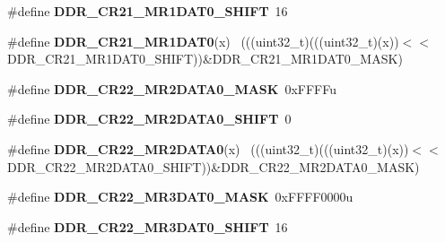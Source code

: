 \begin{DoxyCompactItemize}
\item 
\hypertarget{group___d_d_r___register___masks_gadfa946a8ccca9eb80a28a8cdddaa2c47}{}\#define {\bfseries D\+D\+R\+\_\+\+C\+R21\+\_\+\+M\+R1\+D\+A\+T0\+\_\+\+S\+H\+I\+F\+T}~16\label{group___d_d_r___register___masks_gadfa946a8ccca9eb80a28a8cdddaa2c47}

\item 
\hypertarget{group___d_d_r___register___masks_ga739910b443ad045dfb582322bc08f86f}{}\#define {\bfseries D\+D\+R\+\_\+\+C\+R21\+\_\+\+M\+R1\+D\+A\+T0}(x)                                        ~(((uint32\+\_\+t)(((uint32\+\_\+t)(x))$<$$<$D\+D\+R\+\_\+\+C\+R21\+\_\+\+M\+R1\+D\+A\+T0\+\_\+\+S\+H\+I\+F\+T))\&D\+D\+R\+\_\+\+C\+R21\+\_\+\+M\+R1\+D\+A\+T0\+\_\+\+M\+A\+S\+K)\label{group___d_d_r___register___masks_ga739910b443ad045dfb582322bc08f86f}

\item 
\hypertarget{group___d_d_r___register___masks_gab836b10a64429635c7a64460f8bf5132}{}\#define {\bfseries D\+D\+R\+\_\+\+C\+R22\+\_\+\+M\+R2\+D\+A\+T\+A0\+\_\+\+M\+A\+S\+K}~0x\+F\+F\+F\+Fu\label{group___d_d_r___register___masks_gab836b10a64429635c7a64460f8bf5132}

\item 
\hypertarget{group___d_d_r___register___masks_gab3b7ec00255d0b7a3b4b91347ffc4a70}{}\#define {\bfseries D\+D\+R\+\_\+\+C\+R22\+\_\+\+M\+R2\+D\+A\+T\+A0\+\_\+\+S\+H\+I\+F\+T}~0\label{group___d_d_r___register___masks_gab3b7ec00255d0b7a3b4b91347ffc4a70}

\item 
\hypertarget{group___d_d_r___register___masks_ga0b528e95966c4951222da035247c2f7d}{}\#define {\bfseries D\+D\+R\+\_\+\+C\+R22\+\_\+\+M\+R2\+D\+A\+T\+A0}(x)                                      ~(((uint32\+\_\+t)(((uint32\+\_\+t)(x))$<$$<$D\+D\+R\+\_\+\+C\+R22\+\_\+\+M\+R2\+D\+A\+T\+A0\+\_\+\+S\+H\+I\+F\+T))\&D\+D\+R\+\_\+\+C\+R22\+\_\+\+M\+R2\+D\+A\+T\+A0\+\_\+\+M\+A\+S\+K)\label{group___d_d_r___register___masks_ga0b528e95966c4951222da035247c2f7d}

\item 
\hypertarget{group___d_d_r___register___masks_ga7cdbc794400570a81530eaaec3f67c46}{}\#define {\bfseries D\+D\+R\+\_\+\+C\+R22\+\_\+\+M\+R3\+D\+A\+T0\+\_\+\+M\+A\+S\+K}~0x\+F\+F\+F\+F0000u\label{group___d_d_r___register___masks_ga7cdbc794400570a81530eaaec3f67c46}

\item 
\hypertarget{group___d_d_r___register___masks_ga21daf373caf4cc0c6508348855832eee}{}\#define {\bfseries D\+D\+R\+\_\+\+C\+R22\+\_\+\+M\+R3\+D\+A\+T0\+\_\+\+S\+H\+I\+F\+T}~16\label{group___d_d_r___register___masks_ga21daf373caf4cc0c6508348855832eee}


\end{DoxyCompactItemize}
